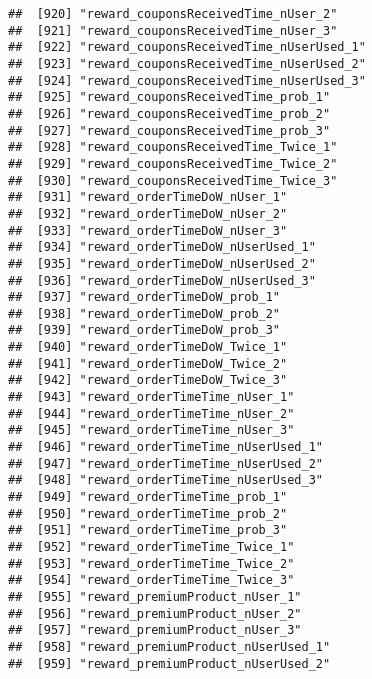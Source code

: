 \documentclass[10pt]{report}
\begin{document}
\begin{verbatim}
##  [920] "reward_couponsReceivedTime_nUser_2"                   
##  [921] "reward_couponsReceivedTime_nUser_3"                   
##  [922] "reward_couponsReceivedTime_nUserUsed_1"               
##  [923] "reward_couponsReceivedTime_nUserUsed_2"               
##  [924] "reward_couponsReceivedTime_nUserUsed_3"               
##  [925] "reward_couponsReceivedTime_prob_1"                    
##  [926] "reward_couponsReceivedTime_prob_2"                    
##  [927] "reward_couponsReceivedTime_prob_3"                    
##  [928] "reward_couponsReceivedTime_Twice_1"                   
##  [929] "reward_couponsReceivedTime_Twice_2"                   
##  [930] "reward_couponsReceivedTime_Twice_3"                   
##  [931] "reward_orderTimeDoW_nUser_1"                          
##  [932] "reward_orderTimeDoW_nUser_2"                          
##  [933] "reward_orderTimeDoW_nUser_3"                          
##  [934] "reward_orderTimeDoW_nUserUsed_1"                      
##  [935] "reward_orderTimeDoW_nUserUsed_2"                      
##  [936] "reward_orderTimeDoW_nUserUsed_3"                      
##  [937] "reward_orderTimeDoW_prob_1"                           
##  [938] "reward_orderTimeDoW_prob_2"                           
##  [939] "reward_orderTimeDoW_prob_3"                           
##  [940] "reward_orderTimeDoW_Twice_1"                          
##  [941] "reward_orderTimeDoW_Twice_2"                          
##  [942] "reward_orderTimeDoW_Twice_3"                          
##  [943] "reward_orderTimeTime_nUser_1"                         
##  [944] "reward_orderTimeTime_nUser_2"                         
##  [945] "reward_orderTimeTime_nUser_3"                         
##  [946] "reward_orderTimeTime_nUserUsed_1"                     
##  [947] "reward_orderTimeTime_nUserUsed_2"                     
##  [948] "reward_orderTimeTime_nUserUsed_3"                     
##  [949] "reward_orderTimeTime_prob_1"                          
##  [950] "reward_orderTimeTime_prob_2"                          
##  [951] "reward_orderTimeTime_prob_3"                          
##  [952] "reward_orderTimeTime_Twice_1"                         
##  [953] "reward_orderTimeTime_Twice_2"                         
##  [954] "reward_orderTimeTime_Twice_3"                         
##  [955] "reward_premiumProduct_nUser_1"                        
##  [956] "reward_premiumProduct_nUser_2"                        
##  [957] "reward_premiumProduct_nUser_3"                        
##  [958] "reward_premiumProduct_nUserUsed_1"                    
##  [959] "reward_premiumProduct_nUserUsed_2"                    

\end{verbatim}
\end{document}
